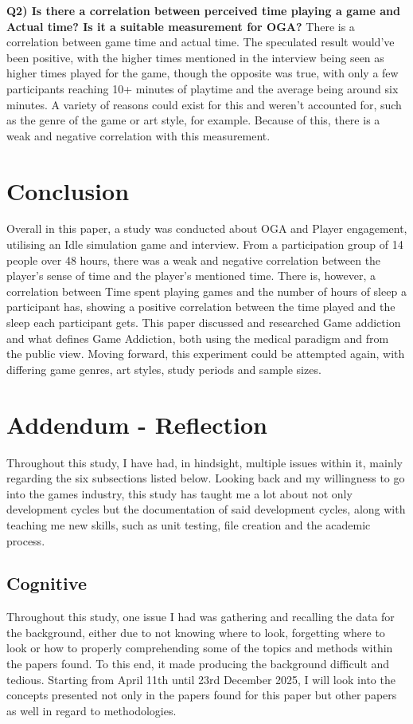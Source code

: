 \documentclass[conference]{IEEEtran}
\begin{document}
 \textbf{Q2) Is there a correlation between perceived time playing a game and Actual time? Is it a suitable measurement for OGA?}
There is a correlation between game time and actual time. The speculated result would've been positive, with the higher times mentioned in the interview being seen as higher times played for the game, though the opposite was true, with only a few participants reaching 10+ minutes of playtime and the average being around six minutes. A variety of reasons could exist for this and weren't accounted for, such as the genre of the game or art style, for example. Because of this, there is a weak and negative correlation with this measurement.

\section{Conclusion}
Overall in this paper, a study was conducted about OGA and Player engagement, utilising an Idle simulation game and interview. From a participation group of 14 people over 48 hours, there was a weak and negative correlation between the player's sense of time and the player's mentioned time. There is, however, a correlation between Time spent playing games and the number of hours of sleep a participant has, showing a positive correlation between the time played and the sleep each participant gets. This paper discussed and researched Game addiction and what defines Game Addiction, both using the medical paradigm and from the public view. Moving forward, this experiment could be attempted again, with differing game genres, art styles, study periods and sample sizes.


 
\section {Addendum - Reflection}
Throughout this study, I have had, in hindsight, multiple issues within it, mainly regarding the six subsections listed below. Looking back and my willingness to go into the games industry, this study has taught me a lot about not only development cycles but the documentation of said development cycles, along with teaching me new skills, such as unit testing, file creation and the academic process.
\subsection{Cognitive}
Throughout this study, one issue I had was gathering and recalling the data for the background, either due to not knowing where to look, forgetting where to look or how to properly comprehending some of the topics and methods within the papers found. To this end, it made producing the background difficult and tedious. Starting from April 11th until 23rd December 2025, I will look into the concepts presented not only in the papers found for this paper but other papers as well in regard to methodologies. 
\end{document}
